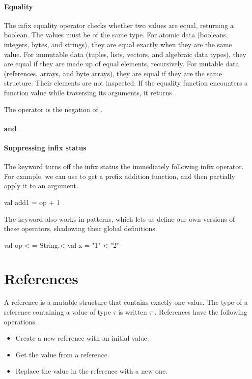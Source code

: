 \documentclass[12pt,a4paper]{book}
\begin{document}
\paragraph{Equality}

The infix equality operator \smlinline{=} checks whether two values are equal, returning a boolean. The values must be of the same type. For atomic data (booleans, integers, bytes, and strings), they are equal exactly when they are the same value. For immutable data (tuples, lists, vectors, and algebraic data types), they are equal if they are made up of equal elements, recursively. For mutable data (references, arrays, and byte arrays), they are equal if they are the same structure. Their elements are not inspected.
If the equality function encounters a function value while traversing its arguments, it returns .

The \smlinline{<>} operator is the negation of \smlinline{=}.

\paragraph{ and }

\paragraph{Suppressing infix status}
The  keyword turns off the infix status the immediately following
infix operator.  For example, we can use  to get a prefix
addition function, and then partially apply it to an argument.
\begin{smlcode}
val add1 = op + 1
\end{smlcode}

The  keyword also works in patterns, which lets us define our own
versions of these operators, shadowing their global definitions.
\begin{smlcode}
val op < = String.<
val x = "1" < "2"
\end{smlcode}


\section{References}
\label{sect:ref}

A reference is a mutable structure that contains exactly one value. The type of a reference containing a value of type $\tau$ is written $\tau$ .
References have the following operations.
\begin{itemize}
\item
{} Create a new reference with an initial value.
\item
{} Get the value from a reference.
\item
{} Replace the value in the reference with a new one.
\end{itemize}
\end{document}
